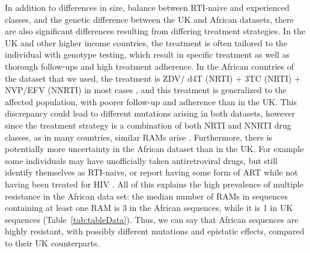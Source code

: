 \documentclass[
  11pt,
  twoside,
  BCOR=10mm,
  listof=totoc]{scrbook}
\begin{document}
In addition to differences in size, balance between RTI-naive and
experienced classes, and the genetic difference between the UK and
African datasets, there are also significant differences resulting from
differing treatment strategies. In the UK and other higher income
countries, the treatment is often tailored to the individual with
genotype testing, which result in specific treatment as well as thorough
follow-ups and high treatment adherence. In the African countries of the
dataset that we used, the treatment is ZDV/ d4T (NRTI) + 3TC (NRTI) +
NVP/EFV (NNRTI) in most cases
\autocite{villabona-arenasIndepthAnalysisHIV12016}, and this treatment is
generalized to the affected population, with poorer follow-up and
adherence than in the UK. This discrepancy could lead to different
mutations arising in both datasets, however since the treatment strategy
is a combination of both NRTI and NNRTI drug classes, as in many
countries, similar RAMs arise
\autocite{villabona-arenasIndepthAnalysisHIV12016}. Furthermore, there is
potentially more uncertainty in the African dataset than in the UK. For
example some individuals may have unofficially taken antiretroviral
drugs, but still identify themselves as RTI-naive, or report having some
form of ART while not having been treated for HIV
\autocite{mooneySocialDesirabilityBias2018}. All of this explains the high
prevalence of multiple resistance in the African data set: the median
number of RAMs in sequences containing at least one RAM is 3 in the
African sequences, while it is 1 in UK sequences
(Table~\ref{tab:tableData}).
Thus, we can say that African sequences are highly resistant, with
possibly different mutations and epistatic effects, compared to their UK
counterparts.
\end{document}
